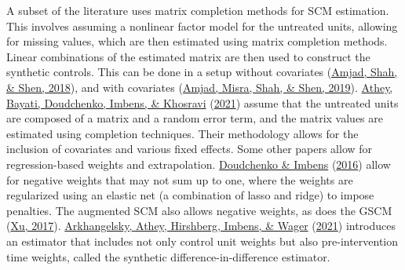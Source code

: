 \documentclass[12pt,nobind, a4paper]{reedthesis}
\begin{document}
 A subset of the literature uses matrix completion methods for SCM estimation. This involves assuming a nonlinear factor model for the untreated units, allowing for missing values, which are then estimated using matrix completion methods. Linear combinations of the estimated matrix are then used to construct the synthetic controls. This can be done in a setup without covariates (\protect\hyperlink{ref-amjad_robust_2018}{Amjad, Shah, \& Shen, 2018}), and with covariates (\protect\hyperlink{ref-amjad_mrsc_2019}{Amjad, Misra, Shah, \& Shen, 2019}). \protect\hyperlink{ref-athey_matrix_2021}{Athey, Bayati, Doudchenko, Imbens, \& Khosravi} (\protect\hyperlink{ref-athey_matrix_2021}{2021}) assume that the untreated units are composed of a matrix and a random error term, and the matrix values are estimated using completion techniques. Their methodology allows for the inclusion of covariates and various fixed effects. Some other papers allow for regression-based weights and extrapolation. \protect\hyperlink{ref-doudchenko_balancing_2016}{Doudchenko \& Imbens} (\protect\hyperlink{ref-doudchenko_balancing_2016}{2016}) allow for negative weights that may not sum up to one, where the weights are regularized using an elastic net (a combination of lasso and ridge) to impose penalties. The augmented SCM also allows negative weights, as does the GSCM (\protect\hyperlink{ref-xu_generalized_2017}{Xu, 2017}). \protect\hyperlink{ref-arkhangelsky_synthetic_2021}{Arkhangelsky, Athey, Hirshberg, Imbens, \& Wager} (\protect\hyperlink{ref-arkhangelsky_synthetic_2021}{2021}) introduces an estimator that includes not only control unit weights but also pre-intervention time weights, called the synthetic difference-in-difference estimator.
 \linebreak
\end{document}
